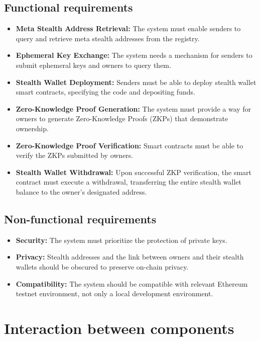 \subsection*{Functional requirements}
\begin{itemize}
    \item \textbf{Meta Stealth Address Retrieval:} The system must enable senders
        to query and retrieve meta stealth addresses from the registry.
    \item \textbf{Ephemeral Key Exchange:} The system needs a mechanism for senders
        to submit ephemeral keys and owners to query them.
    \item \textbf{Stealth Wallet Deployment:} Senders must be able to deploy
        stealth wallet smart contracts, specifying the code and depositing funds.
    \item \textbf{Zero-Knowledge Proof Generation:} The system must provide a way
        for owners to generate Zero-Knowledge Proofs (ZKPs) that demonstrate
        ownership.
    \item \textbf{Zero-Knowledge Proof Verification:} Smart contracts must be able
        to verify the ZKPs submitted by owners.
    \item \textbf{Stealth Wallet Withdrawal:} Upon successful ZKP
        verification, the smart contract must execute a withdrawal, transferring
        the entire stealth wallet balance to the owner's designated address.
\end{itemize}

\subsection*{Non-functional requirements}
\begin{itemize}
    \item \textbf{Security:} The system must prioritize the protection of private keys.
    \item \textbf{Privacy:} Stealth addresses and the link between owners and
        their stealth wallets should be obscured to preserve on-chain privacy.
    \item \textbf{Compatibility:} The system should be compatible with
        relevant Ethereum testnet environment, not only a local
        development environment.
\end{itemize}

\pagebreak
\section{Interaction between components}

